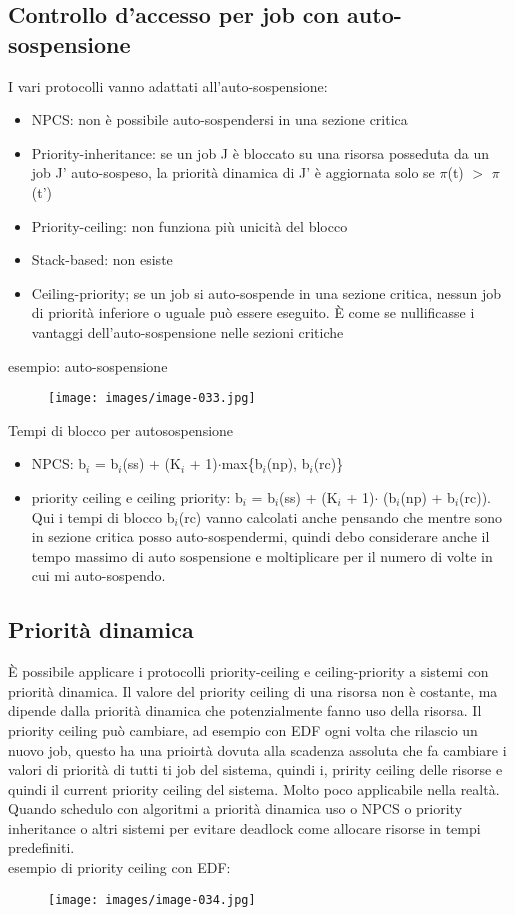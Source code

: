 \documentclass[12pt, oneside]{extbook}
\begin{document}
\subsection{Controllo d'accesso per job con auto-sospensione}
I vari protocolli vanno adattati all'auto-sospensione:
\begin{itemize}
\item NPCS: non è possibile auto-sospendersi in una sezione critica
\item Priority-inheritance: se un job J è bloccato su una risorsa posseduta da un job J' auto-sospeso, la priorità dinamica di J' è aggiornata solo se $\pi$(t) $>$ $\pi$(t')
\item Priority-ceiling: non funziona più unicità del blocco
\item Stack-based: non esiste
\item Ceiling-priority; se un job si auto-sospende in una sezione critica, nessun job di priorità inferiore o uguale può essere eseguito. È come se nullificasse i vantaggi dell'auto-sospensione nelle sezioni critiche
\end{itemize}
esempio: auto-sospensione\\
\begin{figure}[!h]
\centering
\texttt{[image: images/image-033.jpg]}
\end{figure}
Tempi di blocco per autosospensione
\begin{itemize}
\item NPCS: b$_{i}$ = b$_{i}$(ss) + (K$_{i}$ + 1)$\cdot$max\{b$_{i}$(np), b$_{i}$(rc)\}
\item priority ceiling e ceiling priority: b$_{i}$ = b$_{i}$(ss) + (K$_{i}$ + 1)$\cdot$ (b$_{i}$(np) + b$_{i}$(rc)). Qui i tempi di blocco b$_{i}$(rc) vanno calcolati anche pensando che mentre sono in sezione critica posso auto-sospendermi, quindi debo considerare anche il tempo massimo di auto sospensione e moltiplicare per il numero di volte in cui mi auto-sospendo.
\end{itemize}
\subsection{Priorità dinamica}
È possibile applicare i protocolli priority-ceiling e ceiling-priority a sistemi con priorità dinamica. Il valore del priority ceiling di una risorsa non è costante, ma dipende dalla priorità dinamica che potenzialmente fanno uso della risorsa. Il priority ceiling può cambiare, ad esempio con EDF ogni volta che rilascio un nuovo job, questo ha una prioirtà dovuta alla scadenza assoluta che fa cambiare i valori di priorità di tutti ti job del sistema, quindi i, pririty ceiling delle risorse e quindi il current priority ceiling del sistema. Molto poco applicabile nella realtà. Quando schedulo con algoritmi a priorità dinamica uso o NPCS o priority inheritance o altri sistemi per evitare deadlock come allocare risorse in tempi predefiniti.\\ esempio di priority ceiling con EDF:\\
\begin{figure}[!h]
\centering
\texttt{[image: images/image-034.jpg]}
\end{figure}
\end{document}
